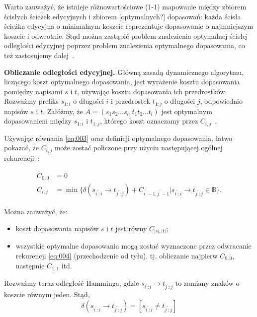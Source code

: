 \documentclass{praca1}
\begin{document}
Warto zauważyć, że istnieje różnowartościowe (1-1) mapowanie między zbiorem ścisłych ścieżek edycyjnych i zbiorem [optymalnych?] dopasowań: każda ścisła ścieżka edycyjna o minimalnym koszcie reprezentuje dopasowanie o najmniejszym koszcie i odwrotnie. Stąd można zastąpić problem znalezienia optymalnej ścisłej odległości edycyjnej poprzez problem znalezienia optymalnego dopasowania, co też zastosujemy dalej~\cite{Boytsov2011:indexingmethods}.

\textbf{Obliczanie odległości edycyjnej.} Główną zasadą dynamicznego algorytmu, liczącego koszt optymalnego dopasowania, jest wyrażenie kosztu dopasowania pomiędzy napisami $s$ i $t$, używając kosztu dopasowania ich przedrostków. Rozważmy prefiks $s_{1:i}$ o długości $i$ i przedrostek $t_{1:j}$ o długości $j$, odpowiednio napisów $s$ i $t$. Załóżmy, że $A = (s_1 s_2\ldots s_l, t_1 t_2 \ldots t_l)$ jest optymalnym dopasowaniem między $s_{1:i}$ i $t_{1:j}$, którego koszt oznaczamy przez $C_{i,j}$~\cite{Boytsov2011:indexingmethods}.

Używając równania \ref{eq:003} oraz definicji optymalnego dopasowania, łatwo pokazać, że $C_{i,j}$ może zostać policzone przy użyciu następującej ogólnej rekurencji~\cite{Ukkonen1985:algorithmsforapprox}:


\begin{align}
\begin{split}
\label{eq:004}
C_{0,0} &= 0 \\
C_{i,j} &= \min\{\delta(s_{i^\prime:i}\rightarrow t_{j^\prime:j}) + C_{i^\prime-1, j^\prime-1} | s_{i^\prime:i}\rightarrow t_{j^\prime:j} \in \mathbb{B}\}.
\end{split}
\end{align}

Można zauważyć, że:
\begin{itemize}
\item koszt dopasowania napisów $s$ i $t$ jest równy $C_{|s|, |t|}$;
\item wszystkie optymalne dopasowania mogą zostać wyznaczone przez odwracanie rekurencji \ref{eq:004} (przechodzenie od tyłu), tj. obliczanie najpierw $C_{0,0}$, następnie $C_{1,1}$ itd.
\end{itemize}




Rozważmy teraz odległość Hamminga, gdzie $s_{i^\prime:i}\rightarrow t_{j^\prime:j}$ to zamiany znaków o koszcie równym jeden. Stąd,
\begin{equation}
\label{eq:005}
\delta(s_{i^\prime:i}\rightarrow t_{j^\prime:j}) = [s_{i^\prime:i}\neq t_{j^\prime:j}]
\end{equation}
\end{document}
